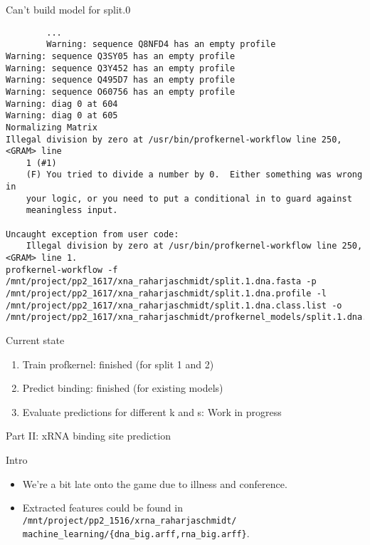 \documentclass[pdf]
{beamer}
\begin{document}
\begin{frame}[fragile]
	\begin{center}
	\large Can't build model for split.0
	\begin{tiny}
		\begin{verbatim}
		...
		Warning: sequence Q8NFD4 has an empty profile
Warning: sequence Q3SY05 has an empty profile
Warning: sequence Q3Y452 has an empty profile
Warning: sequence Q495D7 has an empty profile
Warning: sequence O60756 has an empty profile
Warning: diag 0 at 604 
Warning: diag 0 at 605 
Normalizing Matrix
Illegal division by zero at /usr/bin/profkernel-workflow line 250, <GRAM> line
	1 (#1)
    (F) You tried to divide a number by 0.  Either something was wrong in
    your logic, or you need to put a conditional in to guard against
    meaningless input.
    
Uncaught exception from user code:
	Illegal division by zero at /usr/bin/profkernel-workflow line 250, <GRAM> line 1.
profkernel-workflow -f /mnt/project/pp2_1617/xna_raharjaschmidt/split.1.dna.fasta -p /mnt/project/pp2_1617/xna_raharjaschmidt/split.1.dna.profile -l /mnt/project/pp2_1617/xna_raharjaschmidt/split.1.dna.class.list -o /mnt/project/pp2_1617/xna_raharjaschmidt/profkernel_models/split.1.dna.k2s3

		\end{verbatim}
		\end{tiny}
	\end{center}
\end{frame}

\begin{frame}{Current state}
	\begin{center}
	\begin{enumerate}
	\item Train profkernel: finished (for split 1 and 2)
	\item Predict binding: finished (for existing models)
	\item Evaluate predictions for different k and s: Work in progress
	\end{enumerate}
	\end{center}
\end{frame}

\begin{frame}
	\begin{center}
		\Large Part II: xRNA binding site prediction
	\end{center}
\end{frame}

\begin{frame}{Intro}
	\begin{itemize}
		\item We're a bit late onto the game due to illness and conference.
		\item Extracted features could be found in \texttt{/mnt/project/pp2\_1516/xrna\_raharjaschmidt/} \texttt{machine\_learning/\{dna\_big.arff,rna\_big.arff\}}.
	\end{itemize}
\end{frame}
\end{document}
